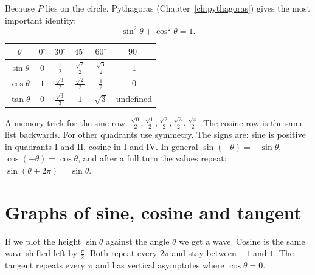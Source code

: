 Because $P$ lies on the circle, Pythagoras (Chapter~\ref{ch:pythagoras}) gives the most important identity:
\[
\boxed{\sin^2\theta+\cos^2\theta=1.}
\]

\begin{center}

\label{fig:b2_6}
\end{center}

\begin{center}
\renewcommand{\arraystretch}{1.8}
\begin{tabular}{c|ccccc}
$\theta$ & $0^\circ$ & $30^\circ$ & $45^\circ$ & $60^\circ$ & $90^\circ$\\\hline
$\sin\theta$ & $0$ & $\frac12$ & $\frac{\sqrt2}{2}$ & $\frac{\sqrt3}{2}$ & $1$\\
$\cos\theta$ & $1$ & $\frac{\sqrt3}{2}$ & $\frac{\sqrt2}{2}$ & $\frac12$ & $0$\\
$\tan\theta$ & $0$ & $\frac{\sqrt3}{3}$ & $1$ & $\sqrt3$ & undefined
\end{tabular}
\end{center}
A memory trick for the sine row: $\frac{\sqrt0}{2},\frac{\sqrt1}{2},\frac{\sqrt2}{2},\frac{\sqrt3}{2},\frac{\sqrt4}{2}$. The cosine row is the same list backwards. For other quadrants use symmetry. The signs are: sine is positive in quadrants I and II, cosine in I and IV. In general $\sin(-\theta)=-\sin\theta$, $\cos(-\theta)=\cos\theta$, and after a full turn the values repeat: $\sin(\theta+2\pi)=\sin\theta$.

\section*{Graphs of sine, cosine and tangent}
If we plot the height $\sin\theta$ against the angle $\theta$ we get a wave. Cosine is the same wave shifted left by $\frac\pi2$. Both repeat every $2\pi$ and stay between $-1$ and $1$. The tangent repeats every $\pi$ and has vertical asymptotes where $\cos\theta=0$.


